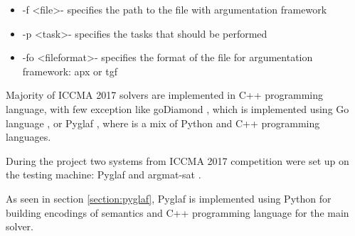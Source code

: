 \begin{itemize}
	\item -f \textless file\textgreater - specifies the path to the file with argumentation framework
	\item -p \textless task\textgreater - specifies the tasks that should be performed
	\item -fo \textless fileformat\textgreater - specifies the format of the file for argumentation framework: apx or tgf
\end{itemize}

Majority of ICCMA 2017 solvers are implemented in C++ programming language, with few exception like goDiamond \citep{goDiamond}, which is implemented using Go language \citep{GoLang}, or Pyglaf \citep{pyglaf}, where is a mix of Python and C++ programming languages. 

During the project two systems from ICCMA 2017 competition were set up on the testing machine: Pyglaf \citep{pyglaf} and argmat-sat \citep{argmatSat}. 

As seen in section \ref{section:pyglaf}, Pyglaf is implemented using Python for building encodings of semantics and C++ programming language for the main solver. 